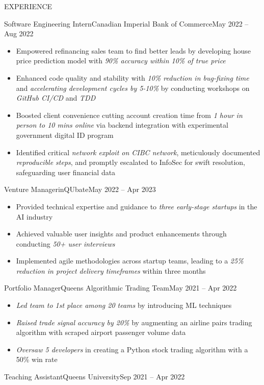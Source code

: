 \documentclass[]{mcdowellcv}
\begin{document}
\begin{cvsection}{EXPERIENCE}
\begin{cvsubsection}{Software Engineering Intern}{Canadian Imperial Bank of Commerce}{May 2022 -- Aug 2022}
		\begin{itemize}%
			\item Empowered refinancing sales team to find better leads by developing house price prediction model with \textit{90\% accuracy within 10\% of true price}
			\item Enhanced code quality and stability with \textit{10\% reduction in bug-fixing time} and \textit{accelerating development cycles by 5-10\%} by conducting workshops on \textit{GitHub CI/CD} and \textit{TDD}
			\item Boosted client convenience cutting account creation time from \textit{1 hour in person to 10 mins online} via backend integration with experimental government digital ID program
			\item Identified critical \textit{network exploit on CIBC network}, meticulously documented \textit{reproducible steps}, and promptly escalated to InfoSec for swift resolution, safeguarding user financial data
		\end{itemize}
	\end{cvsubsection}
	\begin{cvsubsection}{Venture Manager}{inQUbate}{May 2022 -- Apr 2023}   
		\begin{itemize}%
			\item Provided technical expertise and guidance to \textit{three early-stage startups} in the AI industry
			\item Achieved valuable user insights and product enhancements through conducting \textit{50+ user interviews}
			\item Implemented agile methodologies across startup teams, leading to a \textit{25\% reduction in project delivery timeframes} within three months
		\end{itemize}
	\end{cvsubsection}
	\begin{cvsubsection}{Portfolio Manager}{Queen\textquotesingle{}s Algorithmic Trading Team}{May 2021 -- Apr 2022}
		            
		\begin{itemize}%
			\item \textit{Led team to 1st place among 20 teams} by introducing ML techniques
			\item \textit{Raised trade signal accuracy by 20\%} by augmenting an airline pairs trading algorithm with scraped airport passenger volume data
			\item \textit{Oversaw 5 developers} in creating a Python stock trading algorithm with a 50\% win rate
		\end{itemize}
	\end{cvsubsection}
	\begin{cvsubsection}{Teaching Assistant}{Queen\textquotesingle{}s University}{Sep 2021 -- Apr 2022}
		            

\end{cvsubsection}
\end{cvsection}
\end{document}
